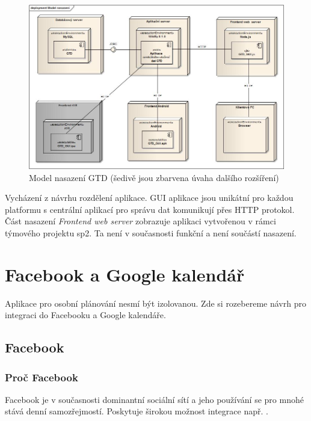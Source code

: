 \documentclass[thesis=B,czech]{FITthesis}[2012/06/26]
\begin{document}
\begin{figure}[h!]\centering
	\includegraphics[width=1\textwidth]{pictures/gtd_deployment_model}
	\caption{Model nasazení GTD (šedivě jsou zbarvena úvaha dalšího rozšíření)}\label{fig:gtd_deployment_model}
\end{figure}

Vycházení z návrhu rozdělení aplikace. GUI aplikace jsou unikátní pro každou platformu s centrální aplikací pro správu dat komunikují přes HTTP protokol. Část nasazení \textit{Frontend web server} zobrazuje aplikaci vytvořenou v rámci týmového projektu \acrshort{sp2}. Ta není v současnosti funkční a není součástí nasazení. 

\section{Facebook a Google kalendář}

Aplikace pro osobní plánování nesmí být izolovanou. Zde si rozebereme návrh pro integraci do Facebooku a Google kalendáře. 

\subsection{Facebook}

\subsubsection{Proč Facebook}
Facebook\cite{design_facebook} je v současnosti dominantní sociální sítí a jeho používání se pro mnohé stává denní samozřejmostí\cite{design_facebook_usage}. Poskytuje širokou možnost integrace např. \cite{design_facebook_integration}.
\end{document}
